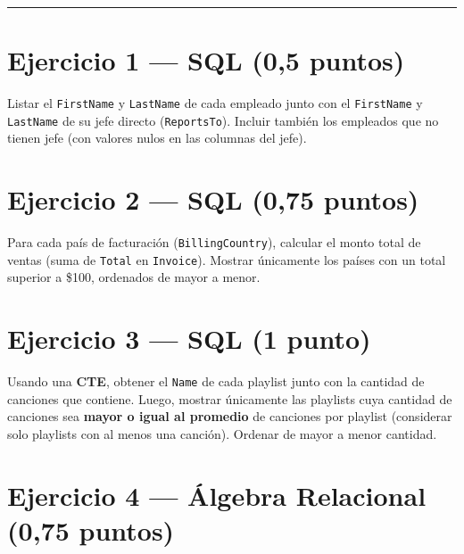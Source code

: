 \documentclass[11pt,a4paper]{article}
\begin{document}
\vspace{4pt}
\noindent\rule{\linewidth}{0.4pt}

\section*{Ejercicio 1 — SQL \hfill\normalfont(0{,}5 puntos)}

Listar el \texttt{FirstName} y \texttt{LastName} de cada empleado junto con el \texttt{FirstName} y \texttt{LastName} de su jefe directo (\texttt{ReportsTo}). Incluir también los empleados que no tienen jefe (con valores nulos en las columnas del jefe).

\vspace{8pt}

\section*{Ejercicio 2 — SQL \hfill\normalfont(0{,}75 puntos)}

Para cada país de facturación (\texttt{BillingCountry}), calcular el monto total de ventas (suma de \texttt{Total} en \texttt{Invoice}). Mostrar únicamente los países con un total superior a \$100, ordenados de mayor a menor.

\vspace{8pt}

\section*{Ejercicio 3 — SQL \hfill\normalfont(1 punto)}

Usando una \textbf{CTE}, obtener el \texttt{Name} de cada playlist junto con la cantidad de canciones que contiene. Luego, mostrar únicamente las playlists cuya cantidad de canciones sea \textbf{mayor o igual al promedio} de canciones por playlist (considerar solo playlists con al menos una canción). Ordenar de mayor a menor cantidad.

\vspace{8pt}

\section*{Ejercicio 4 — Álgebra Relacional \hfill\normalfont(0{,}75 puntos)}
\end{document}
